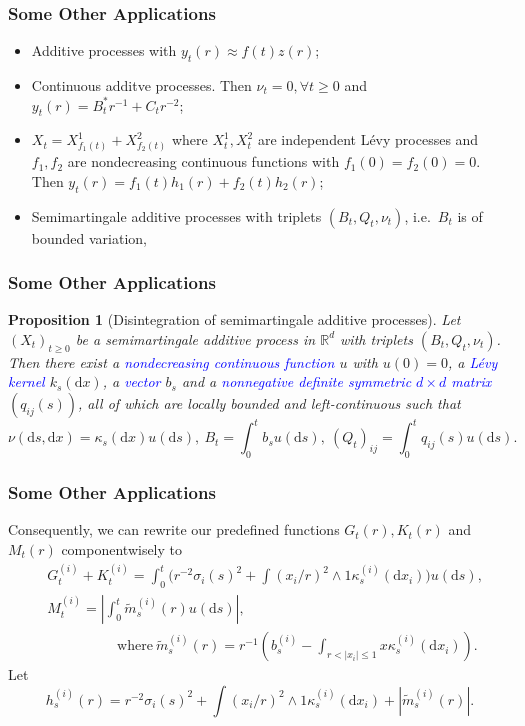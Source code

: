 \documentclass[12pt]{beamer}
\def\RR{\mathbb{R}}
\def\d{\mathrm{d}}
\newtheorem{proposition}{Proposition}
\begin{document}
\begin{frame}
	\frametitle{Some Other Applications}
	\begin{itemize}
			\pause
		\item Additive processes with $y_t(r) \approx f(t)z(r)$;
			\vspace{2ex}
			\pause
		\item Continuous additve processes. Then $\nu_t = 0,\forall t\ge0$ and $y_t(r) = B_t^* r^{-1} + C_t r^{-2}$;
			\vspace{2ex}
			\pause
		\item $X_t = X_{f_1(t)}^1 + X_{f_2(t)}^2$ where $X_t^1,X_t^2$ are independent L\'evy processes and $f_1,f_2$ are nondecreasing continuous functions with $f_1(0)=f_2(0)=0$. Then $y_t(r) = f_1(t)h_1(r) + f_2(t)h_2(r)$;
			\vspace{2ex}
			\pause
		\item Semimartingale additive processes with triplets $(B_t,Q_t,\nu_t)$, i.e.\ $B_t$ is of bounded variation,
	\end{itemize}
\end{frame}
\begin{frame}
	\frametitle{Some Other Applications}
	\begin{proposition}[Disintegration of semimartingale additive processes]
		Let $(X_t)_{t\ge0}$ be a semimartingale additive process in $\RR^d$ with triplets $(B_t,Q_t,\nu_t)$. Then there exist a \textcolor{blue}{nondecreasing continuous function} $u$ with $u(0)=0$, a \textcolor{blue}{L\'evy kernel} $k_s(\d x)$, a \textcolor{blue}{vector} $b_s$ and a \textcolor{blue}{nonnegative definite symmetric $d\times d$ matrix} $(q_{ij}(s))$, all of which are locally bounded and left-continuous such that
		\vspace{-2ex}
		$$
		\nu(\d s,\d x) = \kappa_s(\d x)u(\d s),\ B_t=\int_0^t b_s u(\d s),\ (Q_t)_{ij}=\int_0^t q_{ij}(s) u(\d s).
		$$
	\end{proposition}
\end{frame}
\begin{frame}
	\frametitle{Some Other Applications}
	Consequently, we can rewrite our predefined functions $G_t(r),K_t(r)$ and $M_t(r)$ componentwisely to
	\vspace{-1ex}
	\begin{equation*}
		\begin{split}
			& G_t^{(i)}+K_t^{(i)}=\int_0^t\big(r^{-2}\sigma_i(s)^2+\int(x_i/r)^2\wedge1\kappa_s^{(i)}(\d x_i)\big)u(\d s),\\
			& M_t^{(i)}=\left|\int_0^t\tilde m_s^{(i)}(r)u(\d s)\right|,\\
			& \hspace{2cm} \mathrm{\ where\ } \tilde m_s^{(i)}(r)=r^{-1}\left( b_s^{(i)}-\int_{r<|x_i|\le1}x\kappa_s^{(i)}(\d x_i) \right).
		\end{split}
	\end{equation*}
	\pause
	Let 
	$$
	h_s^{(i)}(r) = r^{-2}\sigma_i(s)^2+\int (x_i/r)^2\wedge1\kappa_s^{(i)}(\d x_i)+|\tilde m_s^{(i)}(r)|.
	$$
\end{frame}
\end{document}
